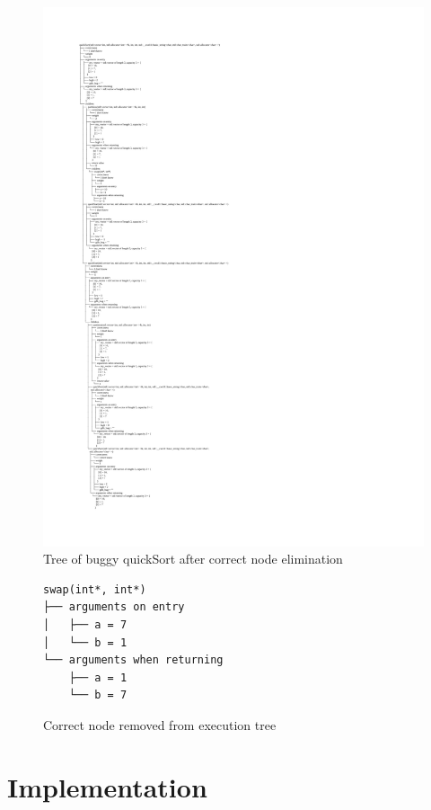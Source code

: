 \begin{figure}[p]
\centering
    \caption{Tree of buggy quickSort after correct node elimination}
    \label{fig:buggyTreeAfter}
\includegraphics[width=\textwidth,height=\textheight,keepaspectratio]{Imagenes/Vectorial/buggySwapRemoved.pdf}
\end{figure}

\begin{figure}[h]
    \centering
    \caption{Correct node removed from execution tree}
    \label{fig:removedNode}
    \begin{verbatim}
swap(int*, int*)
├── arguments on entry
│   ├── a = 7
│   └── b = 1
└── arguments when returning
    ├── a = 1
    └── b = 7
    \end{verbatim}
\end{figure}
\section{Implementation}
